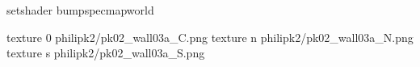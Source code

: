 setshader bumpspecmapworld

texture 0 philipk2/pk02_wall03a_C.png
texture n philipk2/pk02_wall03a_N.png
texture s philipk2/pk02_wall03a_S.png

